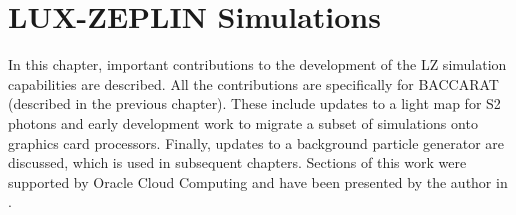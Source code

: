 \chapter{LUX-ZEPLIN Simulations}
\label{chap:lz_simulations}
\par
In this chapter, important contributions to the development of the LZ simulation capabilities are described.
All the contributions are specifically for BACCARAT (described in the previous chapter).
These include updates to a light map for S2 photons and early development work to migrate a subset of simulations onto graphics card processors.
Finally, updates to a background particle generator are discussed, which is used in subsequent chapters.
Sections of this work were supported by Oracle Cloud Computing and have been presented by the author in \cite{se_poster_2018,se_poster_2019_summerschool,se_poster_2019_bristol,SEriksen_IoP_2021_talk_ref}.





